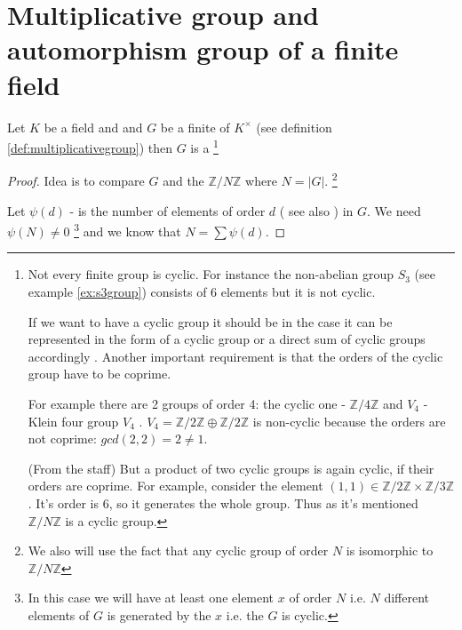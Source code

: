 \section{Multiplicative group and automorphism group of a finite
  field}
\begin{theorem}
  Let $K$ be a field and and $G$ be a finite  of
  $K^\times$ (see definition \ref{def:multiplicativegroup}) then $G$
  is a 
  \footnote{
    Not every finite group is cyclic. For instance the non-abelian
    group $S_3$ (see example \ref{ex:s3group}) consists of 6 elements
    but it is not cyclic.

    If we want to have a cyclic group it should be
     in the case it can be represented in
    the form of a cyclic group or a direct sum of cyclic groups
    accordingly . Another important requirement
    is that the orders of the cyclic group have to be coprime.

    For example there are 2 groups of order 4:
    the cyclic one - $\mathbb{Z}/4\mathbb{Z}$ and $V_4$ -
    Klein four group $V_4$ \cite{wiki:klein4group}.
    $V_4 = \mathbb{Z}/2\mathbb{Z} \oplus \mathbb{Z}/2\mathbb{Z}$ is
    non-cyclic because the orders are not coprime: $gcd(2,2) = 2 \ne
    1.$  

    (From the staff) But a product of two
    cyclic groups is 
    again cyclic, if their orders are coprime. For example, consider
    the element $\left(1,1\right) \in \mathbb{Z}/2\mathbb{Z} \times
    \mathbb{Z}/3\mathbb{Z}$. It's order is 6, so it generates the 
    whole group. Thus as it's mentioned
    $\mathbb{Z}/N\mathbb{Z}$ is a cyclic group.
  }
  \begin{proof}
    Idea is to compare $G$ and the 
    $\mathbb{Z}/N\mathbb{Z}$ where $N = \left|G\right|$.
    \footnote{
      We also will use the fact that any cyclic group of order $N$ is
      isomorphic to $\mathbb{Z}/N\mathbb{Z}$
    }

    Let $\psi\left(d\right)$ - is the number of elements of order $d$
    ( see also ) in $G$. We need
    $\psi\left(N\right) \ne 0$
    \footnote{
      In this case we will have at least one element $x$ of order $N$
      i.e. $N$ different elements of $G$ is generated by the $x$
      i.e. the $G$ is cyclic.
    }
    and we know that
    $N = \sum \psi\left(d\right)$.
    

\end{proof}
\end{theorem}
